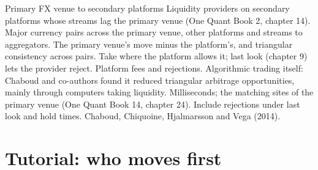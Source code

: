 \begin{strategyfile}{Primary FX venue to secondary platforms}\label{strat:hf:lead-lag-and-cross-venue-trading:fx}
 Liquidity providers on secondary platforms whose streams lag the primary venue (One Quant Book 2, chapter 14).
 Major currency pairs across the primary venue, other platforms and streams to aggregators.
 The primary venue's move minus the platform's, and triangular consistency across pairs.
 Take where the platform allows it; last look (chapter 9) lets the provider reject.
 Platform fees and rejections.
 Algorithmic trading itself: Chaboud and co-authors found it reduced triangular arbitrage opportunities, mainly through computers
taking liquidity.
 Milliseconds; the matching sites of the primary venue (One Quant Book 14, chapter 24).
 Include rejections under last look and hold times.
 Chaboud, Chiquoine, Hjalmarsson and Vega (2014).
\end{strategyfile}

\section{Tutorial: who moves first}\label{tut:hf:lead-lag-and-cross-venue-trading:tut}

